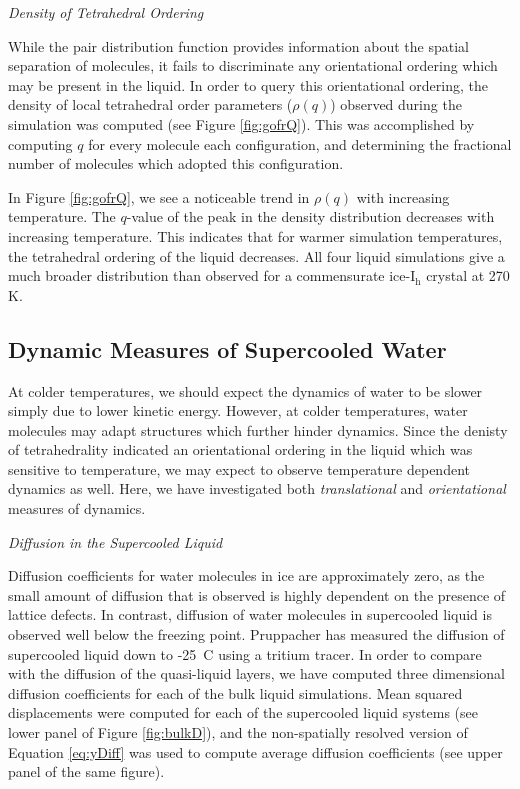 \begin{flushleft}
\textit{Density of Tetrahedral Ordering}
\end{flushleft}

While the pair distribution function provides information about
the spatial separation of molecules, it fails to discriminate any
orientational ordering which may be present in the liquid. In order to
query this orientational ordering, the density of local tetrahedral
order parameters ($\rho (q)$) observed during the simulation was
computed (see Figure \ref{fig:gofrQ}). This was accomplished by
computing $q$ for every molecule each configuration, and determining
the fractional number of molecules which adopted this configuration.

In Figure \ref{fig:gofrQ}, we see a noticeable trend in $\rho (q)$
with increasing temperature. The $q$-value of the peak in the density
distribution decreases with increasing temperature. This indicates
that for warmer simulation temperatures, the tetrahedral ordering of
the liquid decreases. All four liquid simulations give a much broader
distribution than observed for a commensurate ice-I$_\mathrm{h}$
crystal at 270 K.





\subsection{Dynamic Measures of Supercooled Water}
At colder temperatures, we should expect the dynamics of water to be
slower simply due to lower kinetic energy. However, at colder
temperatures, water molecules may adapt structures which further hinder
dynamics. Since the denisty of tetrahedrality indicated an
orientational ordering in the liquid which was sensitive to
temperature, we may expect to observe temperature dependent dynamics
as well. Here, we have investigated both \textit{translational} and
\textit{orientational} measures of dynamics.

\begin{flushleft}
\textit{Diffusion in the Supercooled Liquid}
\end{flushleft}

Diffusion coefficients for water molecules in ice are approximately
zero, as the small amount of diffusion that is observed is highly
dependent on the presence of lattice defects. In contrast, diffusion
of water molecules in supercooled liquid is observed well below the
freezing point.\cite{Debenedetti2003} Pruppacher has measured the
diffusion of supercooled liquid down to -25\degree~C using a tritium
tracer.\cite{Pruppacher1972} In order to compare with the diffusion of
the quasi-liquid layers, we have computed three dimensional diffusion
coefficients for each of the bulk liquid simulations. Mean squared
displacements were computed for each of the supercooled liquid systems
(see lower panel of Figure \ref{fig:bulkD}), and the non-spatially
resolved version of Equation \eqref{eq:yDiff} was used to compute
average diffusion coefficients (see upper panel of the same figure).

